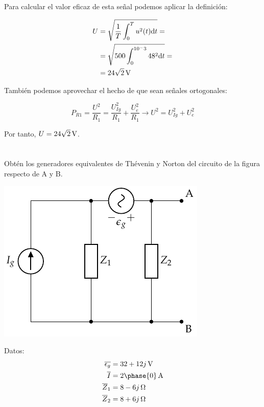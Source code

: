 \documentclass[12pt]{article}
\begin{document}
Para calcular el valor eficaz de esta señal podemos aplicar la definición:

\begin{align*}
  U &= \sqrt{\frac{1}{T}\int_0^Tu^2(t)\mathrm{d}t} = \\
    &= \sqrt{500 \int_0^{10^-3}48^2 \mathrm{d}t} = \\
  &= \SI[parse-numbers=false]{24\sqrt{2}}{\volt}
\end{align*}

También podemos aprovechar el hecho de que sean señales ortogonales:

\begin{equation*}
  P_{R1} = \frac{U^2}{R_1} = \frac{U_{Ig}^2}{R_1} + \frac{U_e^2}{R_1} \rightarrow U^2 = U_{Ig}^2 + U_e^2
\end{equation*}

Por tanto, $U = \SI[parse-numbers=false]{24\sqrt{2}}{\volt}$.

\clearpage


\section{}


Obtén los generadores equivalentes de Thévenin y Norton del circuito de la figura respecto de A y B.

\begin{center}
\includegraphics{figs/Thevenin3}
\end{center}

Datos:
\begin{align*}
  \overline{\epsilon_g} &= \SI[parse-numbers=false]{32 + 12j}{\volt}\\
  \overline{I} &= \SI[parse-numbers=false]{2\phase{0}}{\ampere}\\
  \overline{Z}_1 &= \SI[parse-numbers=false]{8 - 6j}{\ohm}\\
  \overline{Z}_2 &= \SI[parse-numbers=false]{8 + 6j}{\ohm}
\end{align*}
\end{document}
